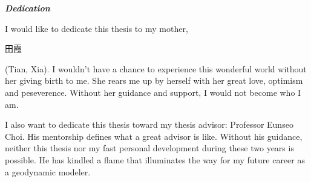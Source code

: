 \begin{center}
\textbf{\textit{Dedication}}
\end{center}

I would like to dedicate this thesis to my mother, \begin{CJK}{UTF8}{gbsn}田霞\end{CJK} (Tian, Xia). I wouldn't have a chance to experience this wonderful world without her giving birth to me. She rears me up by herself with her great love, optimism and peseverence. Without her guidance and support, I would not become who I am.

I also want to dedicate this thesis toward my thesis advisor: Professor Eunseo Choi. His mentorship defines what a great advisor is like. Without his guidance, neither this thesis nor my fast personal development during these two years is possible. He has kindled a flame that illuminates the way for my future career as a geodynamic modeler.   

